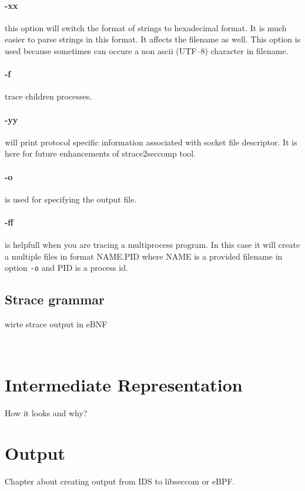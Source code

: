 \paragraph{-xx} this option will switch the format of strings to hexadecimal format.
It is much easier to parse strings in this format. It affects the filename as well.
This option is used because sometimes can occure a non ascii (UTF--8) character in filename.

\paragraph{-f} trace children processes.

\paragraph{-yy} will print protocol specific information associated with socket file descriptor.
It is here for future enhancements of strace2seccomp tool.

\paragraph{-o} is used for specifying the output file.

\paragraph{-ff} is helpfull when you are tracing a multiprocess program.
In this case it will create a multiple files in format
NAME.PID where NAME is a provided filename in option \texttt{-o} and PID is a process id.



\subsection{Strace grammar}
wirte strace output in eBNF

\begin{bnf*}
	{ \bnfor {} \bnfor {}}\\
\end{bnf*}

\section{Intermediate Representation}
How it looks and why?

\section{Output}
Chapter about creating output from IDS to libseccom or eBPF.
